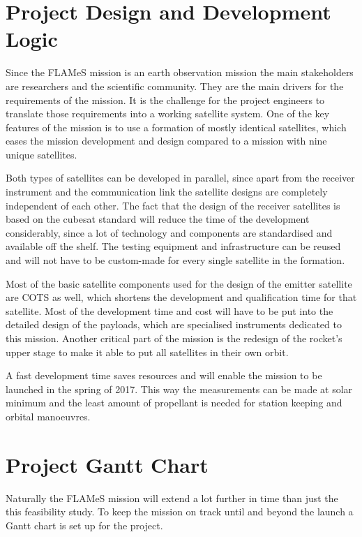 \section{Project Design and Development Logic}
\label{frPMgantt}
Since the \ac{FLAMeS} mission is an earth observation mission the main stakeholders are researchers and the scientific community. They are the main drivers for the requirements of the mission. It is the challenge for the project engineers to translate those requirements into a working satellite system. One of the key features of the mission is to use a formation of mostly identical satellites, which eases the mission development and design compared to a mission with nine unique satellites. 

Both types of satellites can be developed in parallel, since apart from the receiver instrument and the communication link the satellite designs are completely independent of each other. The fact that the design of the receiver satellites is based on the cubesat standard will reduce the time of the development considerably, since a lot of technology and components are standardised and available off the shelf. The testing equipment and infrastructure can be reused and will not have to be custom-made for every single satellite in the formation. 

Most of the basic satellite components used for the design of the emitter satellite are \ac{COTS} as well, which shortens the development and qualification time for that satellite. Most of the development time and cost will have to be put into the detailed design of the payloads, which are specialised instruments dedicated to this mission. Another critical part of the mission is the redesign of the rocket's upper stage to make it able to put all satellites in their own orbit.

A fast development time saves resources and will enable the mission to be launched in the spring of 2017. This way the measurements can be made at solar minimum and the least amount of propellant is needed for station keeping and orbital manoeuvres.

\section{Project Gantt Chart}
Naturally the \ac{FLAMeS} mission will extend a lot further in time than just the this feasibility study. To keep the mission on track until and beyond the launch a Gantt chart is set up for the project.

